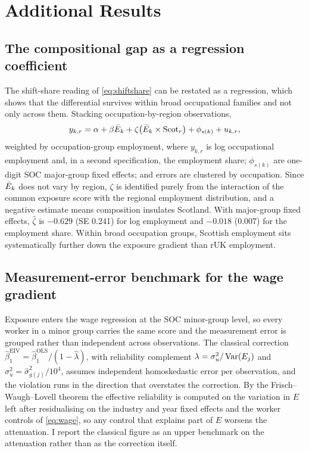 \section{Additional Results}\label{app:additional}

\subsection*{The compositional gap as a regression coefficient}

The shift-share reading of \cref{eq:shiftshare} can be restated as a regression, which shows that the differential survives within broad occupational families and not only across them. Stacking occupation-by-region observations,
\begin{equation}\label{eq:employment}
y_{k,r} = \alpha + \beta \Ebar_k + %
\zeta \bigl( \Ebar_k \times \Scot_r \bigr) + \phi_{s(k)} + u_{k,r},
\end{equation}
weighted by occupation-group employment, where $y_{k,r}$ is log occupational employment and, in a second specification, the employment share; $\phi_{s(k)}$ are one-digit SOC major-group fixed effects; and errors are clustered by occupation. Since $\bar{E}_k$ does not vary by region, $\zeta$ is identified purely from the interaction of the common exposure score with the regional employment distribution, and a negative estimate means composition insulates Scotland. With major-group fixed effects, $\widehat{\zeta}$ is $-0.629$ (SE 0.241) for log employment and $-0.018$ (0.007) for the employment share. Within broad occupation groups, Scottish employment sits systematically further down the exposure gradient than rUK employment.

\subsection*{Measurement-error benchmark for the wage gradient}

Exposure enters the wage regression at the SOC minor-group level, so every worker in a minor group carries the same score and the measurement error is grouped rather than independent across observations. The classical correction $\widehat{\beta}^{\mathrm{EIV}}_1 = \widehat{\beta}^{\mathrm{OLS}}_1 / (1 - \widehat{\lambda})$, with reliability complement $\lambda = \sigma^2_u / \operatorname{Var}(E_j)$ and $\sigma^2_u = \widehat{\sigma}^2_{g(j)} / 10^4$, assumes independent homoskedastic error per observation, and the violation runs in the direction that overstates the correction. By the Frisch--Waugh--Lovell theorem the effective reliability is computed on the variation in $E$ left after residualising on the industry and year fixed effects and the worker controls of \cref{eq:wage}, so any control that explains part of $E$ worsens the attenuation. I report the classical figure as an upper benchmark on the attenuation rather than as the correction itself.

